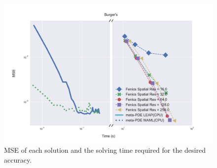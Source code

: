 \begin{figure}[htbp]
  \centering
\includegraphics[width=0.8\linewidth]{figures/burgers.pdf}
\caption{MSE of each solution and the solving time required for the desired accuracy.}%
\label{fig:burgers_summary}%
\end{figure}











